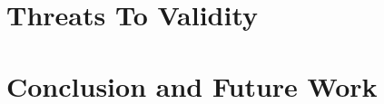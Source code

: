 \documentclass[conference]{IEEEtran}
\begin{document}
\section{Threats To Validity}\label{sec:threats}


\section{Conclusion and Future Work}\label{summary}




\scriptsize

\end{document}
